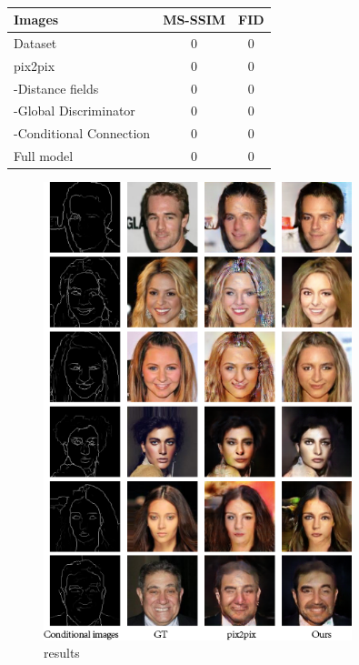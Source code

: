 %
%
\begin{table}[h]
	\centering	
	\caption{ }
	\begin{tabular}{|l|c|c|}\hline
		Images & MS-SSIM & FID\\\hline
		Dataset & $0$ & $0$\\
		pix2pix & $0$ & $0$ \\
		-Distance fields & $0$ & $0$\\
		-Global Discriminator & $0$ & $0$ \\
		-Conditional Connection & $0$ & $0$ \\
		Full model & $0$ & $0$ \\\hline
	\end{tabular}
	\label{tab:evaluation_metrics}
\end{table}
%
%
\begin{figure}
	\includegraphics[width=0.8\textwidth]{figures/results}
	\caption{results}
	\label{fig:results}
\end{figure}
%
%
